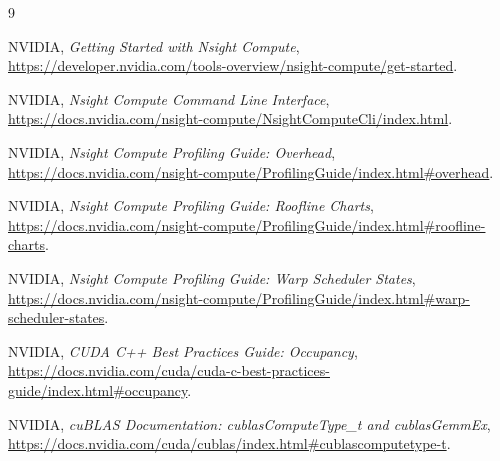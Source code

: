 \documentclass[UTF8,11pt,a4paper,fontset=fandol]{ctexart}
\begin{document}
\begin{thebibliography}{9}

NVIDIA, \emph{Getting Started with Nsight Compute},
\url{https://developer.nvidia.com/tools-overview/nsight-compute/get-started}.

NVIDIA, \emph{Nsight Compute Command Line Interface},
\url{https://docs.nvidia.com/nsight-compute/NsightComputeCli/index.html}.

NVIDIA, \emph{Nsight Compute Profiling Guide: Overhead},
\url{https://docs.nvidia.com/nsight-compute/ProfilingGuide/index.html#overhead}.

NVIDIA, \emph{Nsight Compute Profiling Guide: Roofline Charts},
\url{https://docs.nvidia.com/nsight-compute/ProfilingGuide/index.html#roofline-charts}.

NVIDIA, \emph{Nsight Compute Profiling Guide: Warp Scheduler States},
\url{https://docs.nvidia.com/nsight-compute/ProfilingGuide/index.html#warp-scheduler-states}.

NVIDIA, \emph{CUDA C++ Best Practices Guide: Occupancy},
\url{https://docs.nvidia.com/cuda/cuda-c-best-practices-guide/index.html#occupancy}.

NVIDIA, \emph{cuBLAS Documentation: cublasComputeType\_t and cublasGemmEx},
\url{https://docs.nvidia.com/cuda/cublas/index.html#cublascomputetype-t}.

\end{thebibliography}
\end{document}
